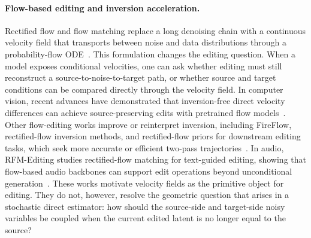 \paragraph{Flow-based editing and inversion acceleration.}
Rectified flow and flow matching replace a long denoising chain with a continuous velocity field that transports between noise and data distributions through a probability-flow ODE~\cite{liu2022flowstraightfastlearning,lipman2023flowmatchinggenerativemodeling,albergo2023buildingnormalizingflowsstochastic}.
This formulation changes the editing question.
When a model exposes conditional velocities, one can ask whether editing must still reconstruct a source-to-noise-to-target path, or whether source and target conditions can be compared directly through the velocity field.
In computer vision, recent advances have demonstrated that inversion-free direct velocity differences can achieve source-preserving edits with pretrained flow models~\cite{kulikov2025floweditinversionfreetextbasedediting}.
Other flow-editing works improve or reinterpret inversion, including FireFlow, rectified-flow inversion methods, and rectified-flow priors for downstream editing tasks, which seek more accurate or efficient two-pass trajectories~\cite{deng2024fireflowfastinversionrectified,rout2024semanticimageinversionediting,wang2025tamingrectifiedflowinversion,yang2025irfds}.
In audio, RFM-Editing studies rectified-flow matching for text-guided editing, showing that flow-based audio backbones can support edit operations beyond unconditional generation~\cite{gao2026rfmeditingrectifiedflowmatching}.
These works motivate velocity fields as the primitive object for editing.
They do not, however, resolve the geometric question that arises in a stochastic direct estimator: how should the source-side and target-side noisy variables be coupled when the current edited latent is no longer equal to the source?

